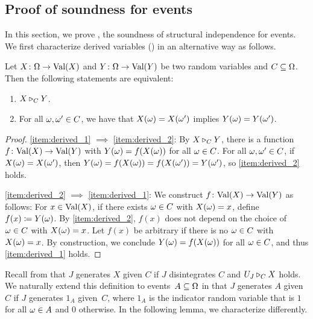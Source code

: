 \documentclass[USenglish,onecolumn]{article}
\begin{document}
\subsection{Proof of soundness for events}
\label{sec:soundevent}
In this section, we prove , the soundness of structural independence for events.
We first characterize derived variables () in an alternative way as follows.
\begin{lemma}
  \label{lemma:characterization_derived_variables}
  Let $X \colon \Omega \to \textnormal{Val}(X)$ and $Y \colon \Omega \to \textnormal{Val}(Y)$ be two random variables and $C \subseteq \Omega$.
  Then the following statements are equivalent:
  \begin{enumerate}[label=(\roman*),leftmargin=*]
     \item\label{item:derived_1} $X \triangleright_C Y$.
     \item\label{item:derived_2} For all $\omega, \omega' \in C$, we have that $X(\omega) = X(\omega')$ implies $Y(\omega) = Y(\omega')$.
  \end{enumerate}
\end{lemma}
\begin{proof}
  \ref{item:derived_1} $\implies$ \ref{item:derived_2}:
  By $X \triangleright_C Y$, there is a function $f \colon \textnormal{Val}(X) \to \textnormal{Val}(Y)$ with $Y(\omega) = f(X(\omega))$ for all $\omega \in C$.
  For all $\omega, \omega' \in C$,
  if $X(\omega) = X(\omega')$, then $Y(\omega) = f(X(\omega)) = f(X(\omega')) = Y(\omega')$, so \ref{item:derived_2} holds.

  \ref{item:derived_2} $\implies$ \ref{item:derived_1}:
  We construct $f \colon \textnormal{Val}(X) \to \textnormal{Val}(Y)$ as follows:
  For $x \in \textnormal{Val}(X)$, if there exists $\omega \in C$ with $X(\omega) = x$, define $f(x) \coloneqq Y(\omega)$.
  By \ref{item:derived_2}, $f(x)$ does not depend on the choice of $\omega \in C$ with $X(\omega) = x$.
  Let $f(x)$ be arbitrary if there is no $\omega \in C$ with $X(\omega) = x$.
  By construction, we conclude $Y(\omega) = f(X(\omega))$ for all $\omega \in C$, and thus \ref{item:derived_1} holds.
\end{proof}

Recall from  that $J$ generates $X$ given $C$ if $J$ disintegrates $C$ and $U_J \triangleright_C X$ holds.
We naturally extend this definition to events~$A\subseteq\Omega$ in that $J$ generates $A$ given~$C$ if $J$ generates $1_A$ given~$C$, where $1_A$ is the indicator random variable that is $1$ for all $\omega\in A$ and $0$ otherwise.
In the following lemma, we characterize  differently.
\end{document}
